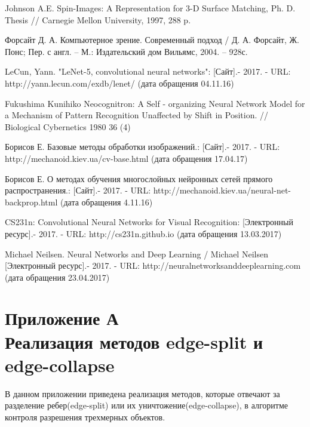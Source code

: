 \documentclass[14pt]{article}
\numberwithin{figure}{section}
\numberwithin{equation}{section}
\begin{document}
\begin{thebibliography}{9}
	Johnson A.E. Spin-Images: A Representation for 3-D Surface Matching, Ph. D. Thesis // Carnegie Mellon University, 1997, 288 p.

    Форсайт Д. А. Компьютерное зрение. Современный подход / Д. А. Форсайт, Ж. Понс; Пер. с англ. – М.: Издательский дом Вильямс, 2004. – 928с.

	LeCun, Yann. "LeNet-5, convolutional neural networks": [Сайт].- 2017. - URL: http://yann.lecun.com/exdb/lenet/ (дата обращения 04.11.16)

	Fukushima Kunihiko Neocognitron: A Self - organizing Neural Network Model for a Mechanism of Pattern Recognition Unaffected by Shift in Position. // Biological Cybernetics 1980 36 (4)

	Борисов Е. Базовые методы обработки изображений.: [Сайт].- 2017. - URL: http://mechanoid.kiev.ua/cv-base.html (дата обращения 17.04.17)

	Борисов Е. О методах обучения многослойных нейронных сетей прямого распространения.: [Сайт].- 2017. - URL: http://mechanoid.kiev.ua/neural-net-backprop.html (дата обращения 4.11.16)

	CS231n: Convolutional Neural Networks for Visual Recognition: [Электронный ресурс].- 2017. - URL: http://cs231n.github.io (дата обращения 13.03.2017)

    Michael Neilsen. Neural Networks and Deep Learning / Michael Neilsen [Электронный ресурс].- 2017. - URL: http://neuralnetworksanddeeplearning.com (дата обращения 23.04.2017)



\end{thebibliography}

\newpage
{}
\section*{Приложение А\\Реализация методов edge-split и edge-collapse}\label{attachA}

В данном приложении приведена реализация методов, которые отвечают за разделение ребер(edge-split) или их уничтожение(edge-collapse), в алгоритме контроля разрешения трехмерных объектов.


\end{document}
